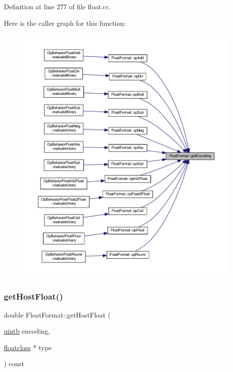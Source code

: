 Definition at line 277 of file float.\+cc.

Here is the caller graph for this function\+:
\nopagebreak
\begin{figure}[H]
\begin{center}
\leavevmode
\includegraphics[width=350pt]{class_float_format_a6f8450c4637e1e2c098b6b1c38f6061f_icgraph}
\end{center}
\end{figure}
\mbox{\label{class_float_format_a5205f99f7973cde7ffe0054d07cf82bc}} 
\subsubsection{\texorpdfstring{getHostFloat()}{getHostFloat()}}
{\footnotesize\ttfamily double Float\+Format\+::get\+Host\+Float (\begin{DoxyParamCaption}\item[{\mbox{\hyperlink{types_8h_a2db313c5d32a12b01d26ac9b3bca178f}{uintb}}}]{encoding,  }\item[{\mbox{\hyperlink{class_float_format_a18acf57dc2fa19c8afe87fa1f61a0481}{floatclass}} $\ast$}]{type }\end{DoxyParamCaption}) const}



